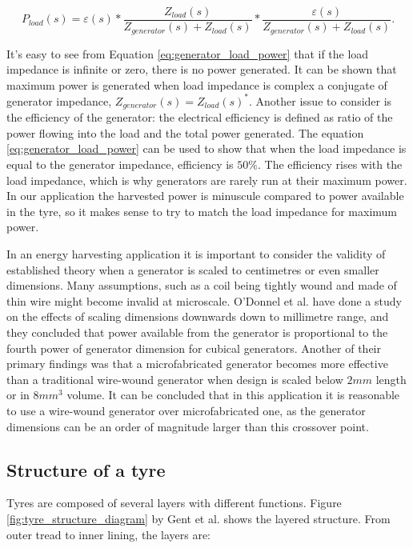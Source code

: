 \begin{equation} \label{eq:generator_load_power}
  P_{load}(s) = \varepsilon(s)*\frac{Z_{load}(s)}{Z_{generator}(s)+Z_{load}(s)}*\frac{\varepsilon(s)}{Z_{generator}(s)+Z_{load}(s)}.
\end{equation}

It's easy to see from Equation \eqref{eq:generator_load_power} that if the load impedance is infinite or zero, there is no power generated. It can be shown that maximum power is generated when load impedance is complex a conjugate of generator impedance, $Z_{generator}(s) = {Z_{load}(s)}^*$. Another issue to consider is the efficiency of the generator: the electrical efficiency is defined as ratio of the power flowing into the load and the total power generated. The equation \eqref{eq:generator_load_power} can be used to show that when the load impedance is equal to the generator impedance, efficiency is $ 50 \%$. The efficiency rises with the load impedance, which is why generators are rarely run at their maximum power. In our application the harvested power is minuscule compared to power available in the tyre, so it makes sense to try to match the load impedance for maximum power.

In an energy harvesting application it is important to consider the validity of established theory when a generator is scaled to centimetres or even smaller dimensions. Many assumptions, such as a coil being tightly wound and made of thin wire might become invalid at microscale. O'Donnel et al. \cite{ODonnell2007} have done a study on the effects of scaling dimensions downwards down to millimetre range, and they concluded that power available from the generator is proportional to the fourth power of generator dimension for cubical generators. Another of their primary findings was that a microfabricated generator becomes more effective than a traditional wire-wound generator when design is scaled below $2 mm$ length or in $8 mm^3$ volume. It can be concluded that in this application it is reasonable to use a wire-wound generator over microfabricated one, as the generator dimensions can be an order of magnitude larger than this crossover point. 


\subsection{Structure of a tyre}

Tyres are composed of several layers with different functions. Figure \ref{fig:tyre_structure_diagram} by Gent et
al. \cite{Gent2005} shows the layered structure. From outer tread to inner lining, the layers are: 

